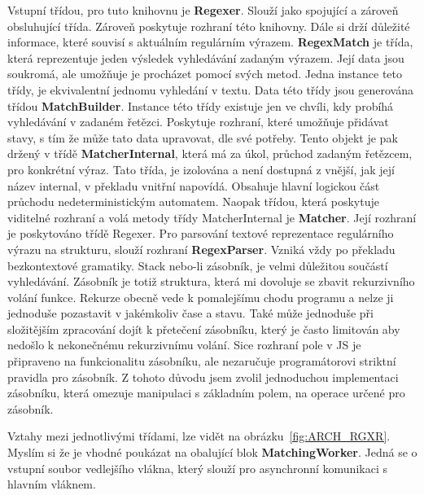 Vstupní třídou, pro tuto knihovnu je \textbf{Regexer}. 
Slouží jako spojující a zároveň obsluhující třída. 
Zároveň poskytuje rozhraní této knihovny.
Dále si drží důležité informace, které souvisí s aktuálním regulárním výrazem.
\textbf{RegexMatch} je třída, která reprezentuje jeden výsledek vyhledávání zadaným výrazem.
Její data jsou soukromá, ale umožňuje je procházet pomocí svých metod.
Jedna instance teto třídy, je ekvivalentní jednomu vyhledání v textu.
Data této třídy jsou generována třídou \textbf{MatchBuilder}.
Instance této třídy existuje jen ve chvíli, kdy probíhá vyhledávání v zadaném řetězci.
Poskytuje rozhraní, které umožňuje přidávat stavy, s tím že může tato data upravovat, dle své potřeby.
Tento objekt je pak držený v třídě \textbf{MatcherInternal}, 
která má za úkol, průchod zadaným řetězcem, pro konkrétní výraz.
Tato třída, je izolována a není dostupná z vnější, jak její název internal, v překladu vnitřní napovídá.
Obsahuje hlavní logickou část průchodu nedeterministickým automatem.
Naopak třídou, která poskytuje viditelné rozhraní a volá metody třídy MatcherInternal je \textbf{Matcher}.
Její rozhraní je poskytováno třídě Regexer.
Pro parsování textové reprezentace regulárního výrazu na strukturu, slouží rozhraní \textbf{RegexParser}.
Vzniká vždy po překladu bezkontextové gramatiky.
Stack nebo-li zásobník, je velmi důležitou součástí vyhledávání.
Zásobník je totiž struktura, která mi dovoluje se zbavit rekurzivního volání funkce.
Rekurze obecně vede k pomalejšímu chodu programu a nelze ji jednoduše pozastavit v jakémkoliv čase a stavu.
Také může jednoduše při složitějším zpracování dojít k přetečení zásobníku, který je často limitován aby nedošlo k nekonečnému rekurzivnímu volání.
Sice rozhraní pole v JS je připraveno na funkcionalitu zásobníku, ale nezaručuje programátorovi striktní pravidla pro zásobník. 
Z tohoto důvodu jsem zvolil jednoduchou implementaci zásobníku, která omezuje manipulaci s základním polem, na operace určené pro zásobník.

Vztahy mezi jednotlivými třídami, lze vidět na obrázku~\ref{fig:ARCH_RGXR}. 
Myslím si že je vhodné poukázat na obalující blok \textbf{MatchingWorker}.
Jedná se o vstupní soubor vedlejšího vlákna, který slouží pro asynchronní komunikaci s hlavním vláknem.


